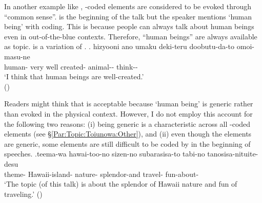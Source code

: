 In another example like \Next,
-coded elements are considered to be evoked through ``common sense''.
\Next is the beginning of the talk
but the speaker mentions  `human being' with  coding.
This is because
people can always talk about human beings even in out-of-the-blue contexts.
Therefore, ``human beings'' are always available as topic.
 is a variation of .
%
\exg.\label{ExNingenToiunowa} hizyooni ano umaku deki-teru doobutu-da-to omoi-masu-ne \\
	human- very  well created- animal-- think-- \\
	`I think that human beings are well-created.' \\
 \hfill{()}
%

Readers might think that \Last is acceptable because `human being' is generic rather than evoked in the physical context.
However, I do not employ this account for the following two reasons:
(i) being generic is a characteristic across all -coded elements (see \S \ref{Par:Topic:Toiunowa:Other}), and
(ii) even though the elements are generic, some elements are still difficult to be coded by  in the beginning of speeches.
%
\exg.\label{Par:Toiunowa:Ex:Hawaii}teema-wa hawai-too-no sizen-no subarasisa-to tabi-no tanosisa-nituite-desu \\
   theme- Hawaii-island- nature- splendor-and travel- fun-about- \\
   `The topic (of this talk) is about the splendor of Hawaii nature and fun of traveling.'
 \hfill{()}

